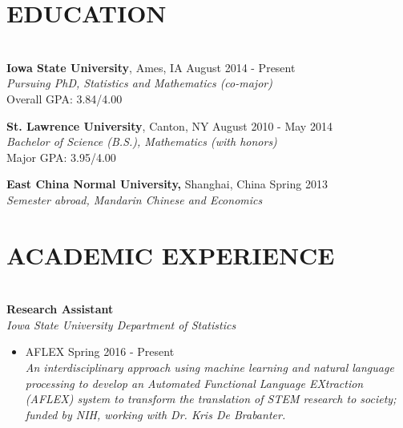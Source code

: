 \documentclass{res} %
\begin{document}
\address{
{\bf Department of Mathematics} \\
Iowa State University \\
244 Carver Hall \\
Ames, IA 50011 \\
}
\begin{resume}


\section{\textsc{EDUCATION}}

\hrulefill \\ %
{\bf Iowa State University}, Ames, IA \hfill August 2014 - Present \\
{\sl Pursuing PhD, Statistics and Mathematics (co-major)} \\
Overall GPA: 3.84/4.00

{\bf St. Lawrence University}, Canton, NY \hfill August 2010 - May 2014 \\
{\sl Bachelor of Science (B.S.), Mathematics (with honors)} \\
Major GPA: 3.95/4.00 

{\bf East China Normal University,} Shanghai, China \hfill Spring 2013 \\
{\sl Semester abroad, Mandarin Chinese and Economics} 





\section{ACADEMIC EXPERIENCE}

\hrulefill \\
{\bf Research Assistant} \\
{\sl Iowa State University Department of Statistics} 
\begin{itemize}
\item AFLEX \dotfill Spring 2016 - Present \\
\emph{An interdisciplinary approach using machine learning and natural language processing to develop an Automated Functional Language EXtraction (AFLEX) system to transform the translation of STEM research
to society; funded by NIH, working with Dr. Kris De Brabanter.}
\end{itemize}


\end{resume}
\end{document}
